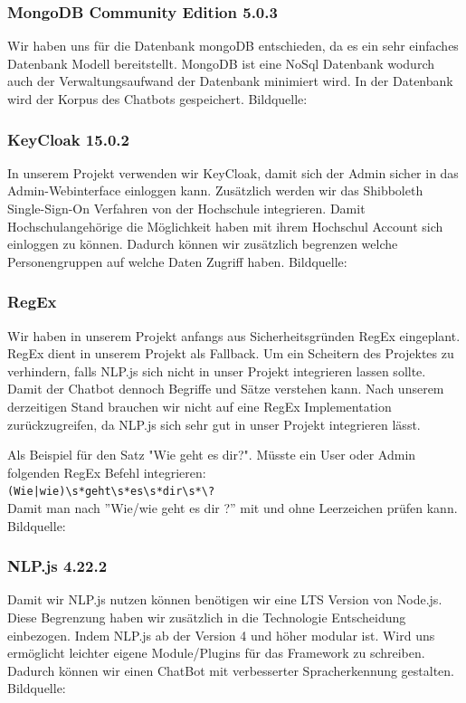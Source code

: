 \subsubsection{MongoDB Community Edition 5.0.3}
Wir haben uns für die Datenbank mongoDB entschieden, da es ein sehr einfaches Datenbank Modell bereitstellt.
MongoDB ist eine NoSql Datenbank wodurch auch der Verwaltungsaufwand der Datenbank minimiert wird.
In der Datenbank wird der Korpus des Chatbots gespeichert.
Bildquelle:\cite{mongodbicon}

\subsubsection{KeyCloak 15.0.2}
In unserem Projekt verwenden wir KeyCloak, damit sich der Admin sicher in das Admin-Webinterface einloggen kann.
Zusätzlich werden wir das Shibboleth Single-Sign-On Verfahren von der Hochschule integrieren.
Damit Hochschulangehörige die Möglichkeit haben mit ihrem Hochschul Account sich einloggen zu können.
Dadurch können wir zusätzlich begrenzen welche Personengruppen auf welche Daten Zugriff haben.
Bildquelle:\cite{keycloakicon}

\newpage
\subsubsection{RegEx}
Wir haben in unserem Projekt anfangs aus Sicherheitsgründen RegEx eingeplant.
RegEx dient in unserem Projekt als Fallback.
Um ein Scheitern des Projektes zu verhindern, falls NLP.js sich nicht in unser Projekt integrieren lassen sollte.
Damit der Chatbot dennoch Begriffe und Sätze verstehen kann.
Nach unserem derzeitigen Stand brauchen wir nicht auf eine RegEx Implementation zurückzugreifen,
da NLP.js sich sehr gut in unser Projekt integrieren lässt. 

\noindent \newline Als Beispiel für den Satz "Wie geht es dir?".
Müsste ein User oder Admin folgenden RegEx Befehl integrieren:\\
\newline \verb/(Wie|wie)\s*geht\s*es\s*dir\s*\?/ \\
\newline Damit man nach ''Wie/wie geht es dir ?'' mit und ohne Leerzeichen prüfen kann.\\
Bildquelle:\cite{regexicon}

\subsubsection{NLP.js 4.22.2}
Damit wir NLP.js nutzen können benötigen wir eine LTS Version von Node.js.
Diese Begrenzung haben wir zusätzlich in die Technologie Entscheidung einbezogen.
Indem NLP.js ab der Version 4 und höher modular ist. Wird uns ermöglicht leichter eigene Module/Plugins
für das Framework zu schreiben.
Dadurch können wir einen ChatBot mit verbesserter Spracherkennung gestalten.
Bildquelle:\cite{nlpicon}
